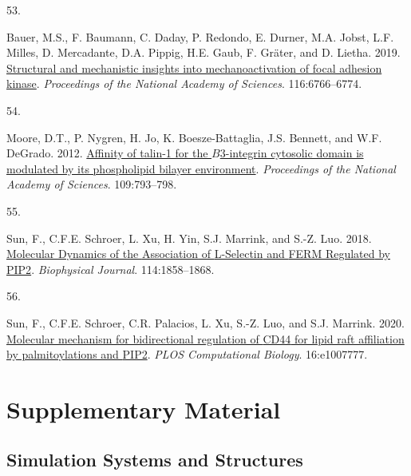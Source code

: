 \documentclass[
  twocolumn]{biophys-new-mod}
\newlength{\cslhangindent}
\newlength{\csllabelwidth}
\newlength{\cslentryspacingunit} %
\newenvironment{CSLReferences}[2] %
 {%
  \setlength{\parindent}{0pt}
  \ifodd #1
  \let\oldpar\par
  \def\par{\hangindent=\cslhangindent\oldpar}
  \fi
  \setlength{\parskip}{#2\cslentryspacingunit}
 }%
 {}
\newcommand{\CSLLeftMargin}[1]{\parbox[t]{\csllabelwidth}{#1}}
\newcommand{\CSLRightInline}[1]{\parbox[t]{\linewidth - \csllabelwidth}{#1}\break}
\begin{document}
\begin{CSLReferences}{0}{0}
\leavevmode{}%
\CSLLeftMargin{53. }%
\CSLRightInline{Bauer, M.S., F. Baumann, C. Daday, P. Redondo, E.
Durner, M.A. Jobst, L.F. Milles, D. Mercadante, D.A. Pippig, H.E. Gaub,
F. Gräter, and D. Lietha. 2019.
\href{https://doi.org/10.1073/pnas.1820567116}{Structural and
mechanistic insights into mechanoactivation of focal adhesion kinase}.
\emph{Proceedings of the National Academy of Sciences}. 116:6766--6774.}

\leavevmode{}%
\CSLLeftMargin{54. }%
\CSLRightInline{Moore, D.T., P. Nygren, H. Jo, K. Boesze-Battaglia, J.S.
Bennett, and W.F. DeGrado. 2012.
\href{https://doi.org/10.1073/pnas.1117220108}{Affinity of talin-1 for
the {\(B\)}3-integrin cytosolic domain is modulated by its phospholipid
bilayer environment}. \emph{Proceedings of the National Academy of
Sciences}. 109:793--798.}

\leavevmode{}%
\CSLLeftMargin{55. }%
\CSLRightInline{Sun, F., C.F.E. Schroer, L. Xu, H. Yin, S.J. Marrink,
and S.-Z. Luo. 2018.
\href{https://doi.org/10.1016/j.bpj.2018.02.034}{Molecular {Dynamics} of
the {Association} of {L-Selectin} and {FERM Regulated} by {PIP2}}.
\emph{Biophysical Journal}. 114:1858--1868.}

\leavevmode{}%
\CSLLeftMargin{56. }%
\CSLRightInline{Sun, F., C.F.E. Schroer, C.R. Palacios, L. Xu, S.-Z.
Luo, and S.J. Marrink. 2020.
\href{https://doi.org/10.1371/journal.pcbi.1007777}{Molecular mechanism
for bidirectional regulation of {CD44} for lipid raft affiliation by
palmitoylations and {PIP2}}. \emph{PLOS Computational Biology}.
16:e1007777.}

\end{CSLReferences}

\newpage

\hypertarget{supplementary-material}{%
\section{Supplementary Material}\label{supplementary-material}}

\hypertarget{sec-system}{%
\subsection{Simulation Systems and Structures}\label{sec-system}}
\end{document}
